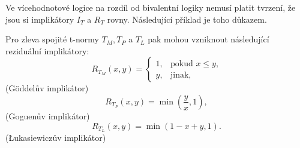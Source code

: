 Ve vícehodnotové logice na rozdíl od bivalentní logiky nemusí platit tvrzení, že jsou si implikátory $I_T$ a $R_T$ rovny. Následující příklad je toho d\r ukazem.
\begin{example} Pro zleva spojité t-normy $T_M, T_P$ a $T_L$ pak mohou vzniknout následující reziduální implikátory:
    \cite{Springer}\\
     $$ R_{T_M}(x,y)=\begin{cases} 1, &\mbox {pokud $x\leq y$,} \\y, &\mbox{jinak,} \end{cases} $$
    (Göddel\r uv implik\' ator)
     $$ R_{T_P}(x,y)=\min \left (\frac yx,1 \right ),$$
    (Goguen\r uv implikátor)
     $$ R_{T_L}(x,y)=\min(1-x+y,1).$$
    (\L{}ukasiewicz\r uv implikátor)\\
\end{example}

